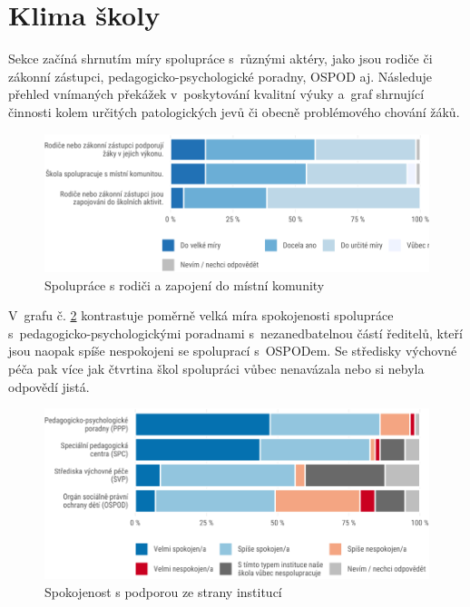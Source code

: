 \documentclass[12pt,a4paper,]{report}
\begin{document}
\newpage

\hypertarget{klima-ux161koly}{%
\section{Klima školy}\label{klima-ux161koly}}

Sekce začíná shrnutím míry spolupráce s~různými aktéry, jako jsou rodiče či zákonní zástupci, pedagogicko-psychologické poradny, OSPOD aj. Následuje přehled vnímaných překážek v~poskytování kvalitní výuky a~graf shrnující činnosti kolem určitých patologických jevů či obecně problémového chování žáků.

\begin{figure}

{\centering \includegraphics[width=\textwidth]{figs/coop-1} 

}

\caption{Spolupráce s rodiči a zapojení do místní komunity}\label{fig:coop}
\end{figure}

V~grafu č. \ref{fig:inst} kontrastuje poměrně velká míra spokojenosti spolupráce s~pedagogicko-psychologickými poradnami s~nezanedbatelnou částí ředitelů, kteří jsou naopak spíše nespokojeni se spoluprací s~OSPODem. Se středisky výchovné péča pak více jak čtvrtina škol spolupráci vůbec nenavázala nebo si nebyla odpovědí jistá.

\begin{figure}

{\centering \includegraphics[width=\textwidth]{figs/inst-1} 

}

\caption{Spokojenost s podporou ze strany institucí}\label{fig:inst}
\end{figure}
\end{document}
